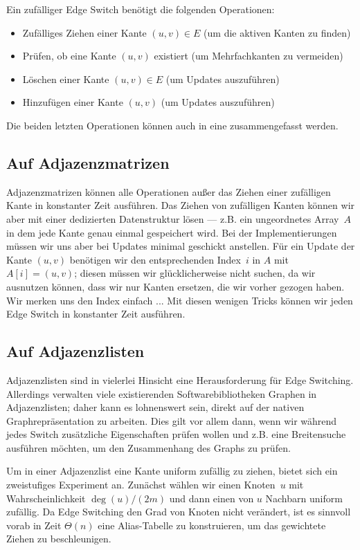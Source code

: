 Ein zufälliger Edge Switch benötigt die folgenden Operationen:
\begin{itemize}
    \item Zufälliges Ziehen einer Kante $(u,v) \in E$ (um die aktiven Kanten zu finden)
    \item Prüfen, ob eine Kante $(u, v)$ existiert (um Mehrfachkanten zu vermeiden)
    \item Löschen einer Kante $(u, v) \in E$ (um Updates auszuführen)
    \item Hinzufügen einer Kante $(u, v)$ (um Updates auszuführen)
\end{itemize}

Die beiden letzten Operationen können auch in eine zusammengefasst werden.

\subsection{Auf Adjazenzmatrizen}
Adjazenzmatrizen können alle Operationen außer das Ziehen einer zufälligen Kante in konstanter Zeit ausführen.
Das Ziehen von zufälligen Kanten können wir aber mit einer dedizierten Datenstruktur lösen ---
z.B. ein ungeordnetes Array~$A$ in dem jede Kante genau einmal gespeichert wird.
Bei der Implementierungen müssen wir uns aber bei Updates minimal geschickt anstellen.
Für ein Update der Kante $(u,v)$ benötigen wir den entsprechenden Index~$i$ in $A$ mit $A[i] = (u,v)$;
diesen müssen wir glücklicherweise nicht suchen, da wir ausnutzen können, dass wir nur Kanten ersetzen, die wir vorher gezogen haben.
Wir merken uns den Index einfach ...
Mit diesen wenigen Tricks können wir jeden Edge Switch in konstanter Zeit ausführen.

\subsection{Auf Adjazenzlisten}
Adjazenzlisten sind in vielerlei Hinsicht eine Herausforderung für Edge Switching.
Allerdings verwalten viele existierenden Softwarebibliotheken Graphen in Adjazenzlisten; daher kann es lohnenswert sein, direkt auf der nativen Graphrepräsentation zu arbeiten.
Dies gilt vor allem dann, wenn wir während jedes Switch zusätzliche Eigenschaften prüfen wollen und z.B. eine Breitensuche ausführen möchten, um den Zusammenhang des Graphs zu prüfen.

Um in einer Adjazenzlist eine Kante uniform zufällig zu ziehen, bietet sich ein zweistufiges Experiment an.
Zunächst wählen wir einen Knoten~$u$ mit Wahrscheinlichkeit $\deg(u) / (2m)$ und dann einen von $u$ Nachbarn uniform zufällig.
Da Edge Switching den Grad von Knoten nicht verändert, ist es sinnvoll vorab in Zeit $\Theta(n)$ eine Alias-Tabelle zu konstruieren, um das gewichtete Ziehen zu beschleunigen.

